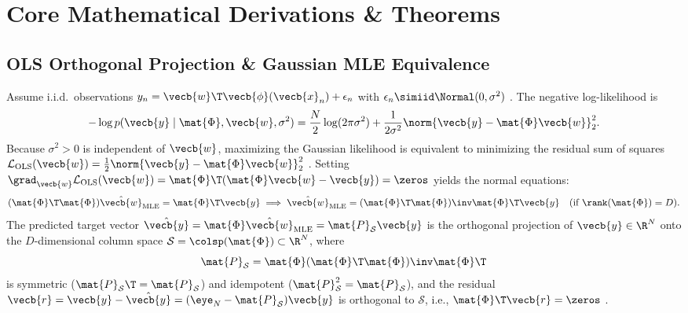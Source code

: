 \documentclass[../../../../master.tex]{subfiles}
\begin{document}
\section{Core Mathematical Derivations \& Theorems}
\label{sec:glm:derivations}

\subsection{OLS Orthogonal Projection \& Gaussian MLE Equivalence}
\label{subsec:glm:ols}

\begin{coremath}
Assume i.i.d.\ observations $y_n = \vecb{w}\T\vecb{\phi}(\vecb{x}_n) + \epsilon_n$ with $\epsilon_n \simiid \Normal(0, \sigma^2)$ . The negative log-likelihood is
\begin{equation}
\label{eq:glm:ols_nll}
-\log p(\vecb{y} \mid \mat{\Phi}, \vecb{w}, \sigma^2) = \frac{N}{2}\log(2\pi\sigma^2) + \frac{1}{2\sigma^2}\norm{\vecb{y} - \mat{\Phi}\vecb{w}}_2^2.
\end{equation}
Because $\sigma^2 > 0$ is independent of $\vecb{w}$, maximizing the Gaussian likelihood is equivalent to minimizing the residual sum of squares $\mathcal{L}_{\mathrm{OLS}}(\vecb{w}) = \frac{1}{2}\norm{\vecb{y} - \mat{\Phi}\vecb{w}}_2^2$ . Setting $\grad_{\vecb{w}}\mathcal{L}_{\mathrm{OLS}}(\vecb{w}) = \mat{\Phi}\T(\mat{\Phi}\vecb{w} - \vecb{y}) = \zeros$ yields the normal equations:
\begin{equation}
\label{eq:glm:normal_eq}
(\mat{\Phi}\T\mat{\Phi})\hat{\vecb{w}}_{\mathrm{MLE}} = \mat{\Phi}\T\vecb{y} \implies \hat{\vecb{w}}_{\mathrm{MLE}} = (\mat{\Phi}\T\mat{\Phi})\inv \mat{\Phi}\T \vecb{y} \quad (\text{if }\rank(\mat{\Phi}) = D).
\end{equation}
The predicted target vector $\hat{\vecb{y}} = \mat{\Phi}\hat{\vecb{w}}_{\mathrm{MLE}} = \mat{P}_{\mathcal{S}}\vecb{y}$ is the orthogonal projection of $\vecb{y} \in \R^N$ onto the $D$-dimensional column space $\mathcal{S} = \colsp(\mat{\Phi}) \subset \R^N$, where
\begin{equation}
\label{eq:glm:proj_matrix}
\mat{P}_{\mathcal{S}} = \mat{\Phi}(\mat{\Phi}\T\mat{\Phi})\inv\mat{\Phi}\T
\end{equation}
is symmetric ($\mat{P}_{\mathcal{S}}\T = \mat{P}_{\mathcal{S}}$) and idempotent ($\mat{P}_{\mathcal{S}}^2 = \mat{P}_{\mathcal{S}}$), and the residual $\vecb{r} = \vecb{y} - \hat{\vecb{y}} = (\eye_N - \mat{P}_{\mathcal{S}})\vecb{y}$ is orthogonal to $\mathcal{S}$, i.e., $\mat{\Phi}\T\vecb{r} = \zeros$ .
\end{coremath}
\end{document}
